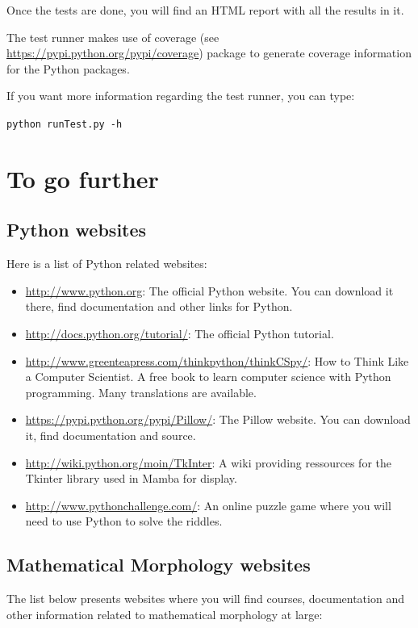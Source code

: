 \documentclass[a4paper,10pt,oneside]{article}
\begin{document}
Once the tests are done, you will find an HTML report with all the results in it.

The test runner makes use of coverage (see \url{https://pypi.python.org/pypi/coverage})
package to generate coverage information for the Python packages.

If you want more information regarding the test runner, you can type:

\texttt{python runTest.py -h}

\pagebreak

\appendix

\section{To go further}
\label{cha:to_go_further}
\subsection{Python websites}

Here is a list of Python related websites:

\begin{itemize}
\item \url{http://www.python.org}: The official Python website. You can download
it there, find documentation and other links for Python.
\item \url{http://docs.python.org/tutorial/}: The official Python tutorial.
\item \url{http://www.greenteapress.com/thinkpython/thinkCSpy/}: How to Think 
Like a Computer Scientist. A free book to learn computer science with Python
programming. Many translations are available.
\item \url{https://pypi.python.org/pypi/Pillow/}: The Pillow
website. You can download it, find documentation and source.
\item \url{http://wiki.python.org/moin/TkInter}: A wiki providing ressources
for the Tkinter library used in Mamba for display.
\item \url{http://www.pythonchallenge.com/}: An online puzzle game where you
will need to use Python to solve the riddles.
\end{itemize}

\subsection{Mathematical Morphology websites}

The list below presents websites where you will find courses, documentation and
other information related to mathematical morphology at large:
\end{document}
